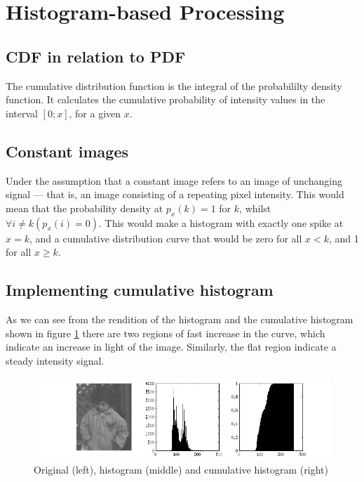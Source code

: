 %
%

\section{Histogram-based Processing}

\subsection{CDF in relation to PDF}
The cumulative distribution function is the integral of the probabililty
density function. It calculates the cumulative probability of intensity values
in the interval $[0;x]$, for a given $x$.

\subsection{Constant images}
Under the assumption that a constant image refers to an image of unchanging
signal --- that is, an image consisting of a repeating pixel intensity. This
would mean that the probability density at $p_x(k) = 1$ for $k$, whilst
$\forall i \neq k (p_x(i) = 0)$. This would make a histogram with exactly one
spike at $x=k$, and a cumulative distribution curve that would be zero for all
$x < k$, and 1 for all $x \geq k$.

\subsection{Implementing cumulative histogram}
As we can see from the rendition of the histogram and the cumulative histogram
shown in figure \ref{fig:1-3} there are two regions of fast increase in the
curve, which indicate an increase in light of the image. Similarly, the flat
region indicate a steady intensity signal.

\begin{figure}[H]
    \includegraphics[scale=0.5]{figures/1-3.jpg}
    \caption{Original (left), histogram (middle) and cumulative histogram
    (right)}
    \label{fig:1-3}
\end{figure}

